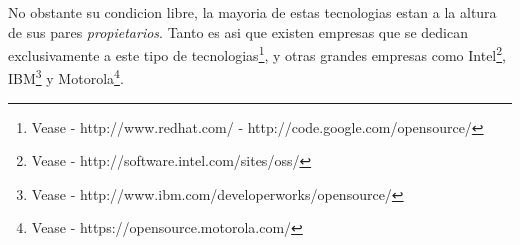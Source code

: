 No obstante su condicion libre, la mayoria de estas tecnologias estan a la
altura de sus pares \emph{propietarios}. Tanto es asi que existen empresas que
se dedican exclusivamente a este tipo de tecnologias\footnote{Vease -
http://www.redhat.com/ - http://code.google.com/opensource/}, y otras grandes
empresas como Intel\footnote{Vease - http://software.intel.com/sites/oss/},
IBM\footnote{Vease - http://www.ibm.com/developerworks/opensource/} y
Motorola\footnote{Vease - https://opensource.motorola.com/}. \\







